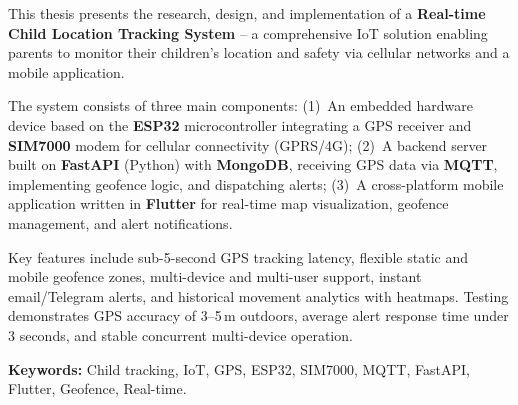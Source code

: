 This thesis presents the research, design, and implementation of a \textbf{Real-time Child Location Tracking System} -- a comprehensive IoT solution enabling parents to monitor their children's location and safety via cellular networks and a mobile application.

\medskip
The system consists of three main components: (1)~An embedded hardware device based on the \textbf{ESP32} microcontroller integrating a GPS receiver and \textbf{SIM7000} modem for cellular connectivity (GPRS/4G); (2)~A backend server built on \textbf{FastAPI} (Python) with \textbf{MongoDB}, receiving GPS data via \textbf{MQTT}, implementing geofence logic, and dispatching alerts; (3)~A cross-platform mobile application written in \textbf{Flutter} for real-time map visualization, geofence management, and alert notifications.

\medskip
Key features include sub-5-second GPS tracking latency, flexible static and mobile geofence zones, multi-device and multi-user support, instant email/Telegram alerts, and historical movement analytics with heatmaps. Testing demonstrates GPS accuracy of 3--5\,m outdoors, average alert response time under 3 seconds, and stable concurrent multi-device operation.

\medskip
\noindent\textbf{Keywords:} Child tracking, IoT, GPS, ESP32, SIM7000, MQTT, FastAPI, Flutter, Geofence, Real-time.

\clearpage
